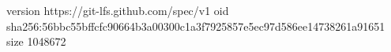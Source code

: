 version https://git-lfs.github.com/spec/v1
oid sha256:56bbc55bffcfc90664b3a00300c1a3f7925857e5ec97d586ee14738261a91651
size 1048672

